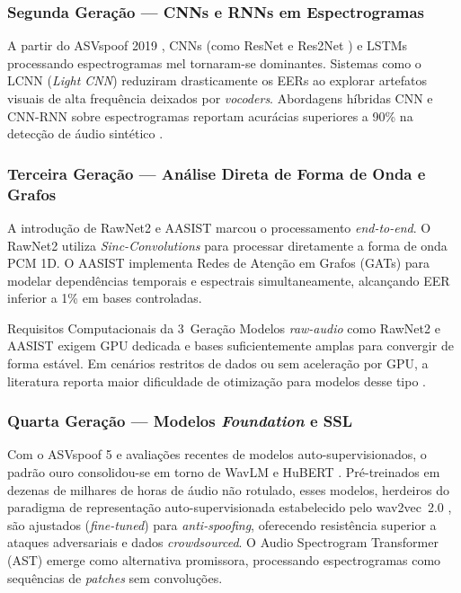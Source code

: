 \documentclass[12pt,a4paper]{article}
\begin{document}
\subsubsection{Segunda Geração --- CNNs e RNNs em Espectrogramas}

A partir do ASVspoof 2019 \cite{todisco2019asvspoof}, CNNs (como ResNet e
Res2Net \cite{gao2021res2net}) e LSTMs processando espectrogramas mel
tornaram-se dominantes. Sistemas como o LCNN (\textit{Light CNN}) reduziram
drasticamente os EERs ao explorar artefatos visuais de alta frequência
deixados por \textit{vocoders}. Abordagens híbridas CNN e CNN-RNN sobre
espectrogramas reportam acurácias superiores a 90\% na detecção de áudio
sintético \cite{pham2024deepfake}.

\subsubsection{Terceira Geração --- Análise Direta de Forma de Onda e Grafos}

A introdução de RawNet2 \cite{tak2021rawnet2} e AASIST \cite{jung2022aasist}
marcou o processamento \textit{end-to-end}. O RawNet2 utiliza
\textit{Sinc-Convolutions} para processar diretamente a forma de onda PCM 1D.
O AASIST implementa Redes de Atenção em Grafos (GATs) para modelar
dependências temporais e espectrais simultaneamente, alcançando EER inferior
a 1\% em bases controladas.

\begin{warningbox}{Requisitos Computacionais da 3\textordfeminine\ Geração}
Modelos \textit{raw-audio} como RawNet2 e AASIST exigem GPU dedicada e
bases suficientemente amplas para convergir de forma estável. Em
cenários restritos de dados ou sem aceleração por GPU, a literatura reporta
maior dificuldade de otimização para modelos desse tipo
\cite{tak2021rawnet2, jung2022aasist}.
\end{warningbox}

\subsubsection{Quarta Geração --- Modelos \textit{Foundation} e SSL}

Com o ASVspoof 5 \cite{wang2024asvspoof5} e avaliações recentes de modelos
auto-supervisionados, o padrão ouro consolidou-se em torno de WavLM
\cite{chen2022wavlm} e HuBERT \cite{hsu2021hubert}. Pré-treinados em dezenas
de milhares de horas de áudio não rotulado, esses modelos, herdeiros do paradigma de
representação auto-supervisionada estabelecido pelo wav2vec~2.0
\cite{baevski2020wav2vec}, são ajustados
(\textit{fine-tuned}) para \textit{anti-spoofing}, oferecendo resistência
superior a ataques adversariais e dados \textit{crowdsourced}. O Audio
Spectrogram Transformer (AST) \cite{gong2021ast} emerge como alternativa
promissora, processando espectrogramas como sequências de \textit{patches}
sem convoluções.
\end{document}
